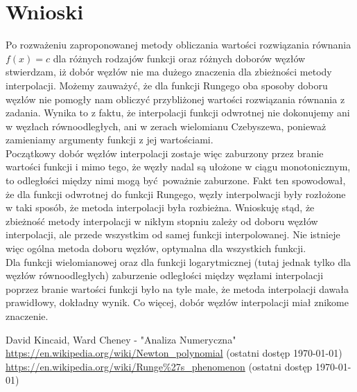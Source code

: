 \documentclass{article}
\begin{document}
\section{Wnioski}
\indent\hspace{4mm} Po rozważeniu zaproponowanej metody obliczania wartości rozwiązania równania $f(x) = c$ dla różnych rodzajów funkcji oraz różnych doborów węzłów stwierdzam, 
iż dobór węzłów nie ma dużego znaczenia dla zbieżności metody interpolacji. Możemy zauważyć, że dla funkcji Rungego oba sposoby doboru węzłów nie pomogły nam obliczyć przybliżonej wartości rozwiązania równania z zadania.
Wynika to z faktu, że interpolacji funkcji odwrotnej nie dokonujemy ani w węzłach równoodległych, ani w zerach wielomianu Czebyszewa, ponieważ zamieniamy argumenty funkcji z jej wartościami.
\\
\indent Początkowy dobór węzłów interpolacji zostaje więc zaburzony przez branie wartości funkcji i mimo tego, że węzły nadal są ułożone w ciągu monotonicznym,
to odległości między nimi mogą być poważnie zaburzone. Fakt ten spowodował, że dla funkcji odwrotnej do funkcji Rungego, węzły interpolwacji były rozłożone w taki sposób, że metoda interpolacji była rozbieżna.
Wnioskuję stąd, że zbieżność metody interpolacji w nikłym stopniu zależy od doboru węzłów interpolacji, ale przede wszystkim od samej funkcji interpolowanej.
Nie istnieje więc ogólna metoda doboru węzłów, optymalna dla wszystkich funkcji.
\\
\indent Dla funkcji wielomianowej oraz dla funkcji logarytmicznej (tutaj jednak tylko dla węzłów równoodległych) zaburzenie odległości między węzłami interpolacji poprzez branie wartości funkcji było na tyle małe,
że metoda interpolacji dawała prawidłowy, dokładny wynik. Co więcej, dobór węzłów interpolacji miał znikome znaczenie.


\begin{thebibliography}{3}
	\itemsep2pt
	
	 David Kincaid, Ward Cheney - "Analiza Numeryczna"
	 \url{https://en.wikipedia.org/wiki/Newton_polynomial}
	(ostatni dostęp \today)
	 \url{https://en.wikipedia.org/wiki/Runge%27s_phenomenon}
	(ostatni dostęp \today)

\end{thebibliography}
\end{document}
